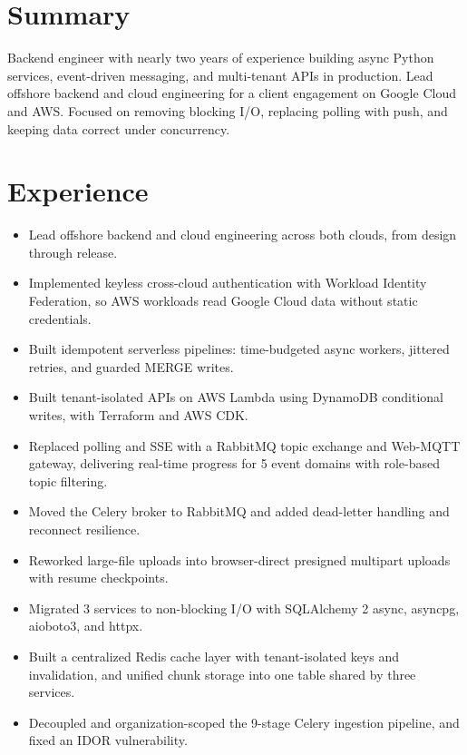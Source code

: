 \documentclass[10pt,a4paper]{article}
\begin{document}

\section{Summary}
Backend engineer with nearly two years of experience building async Python services, event-driven messaging, and multi-tenant APIs in production. Lead offshore backend and cloud engineering for a client engagement on Google Cloud and AWS. Focused on removing blocking I/O, replacing polling with push, and keeping data correct under concurrency.

\section{Experience}

\begin{itemize}
  \item Lead offshore backend and cloud engineering across both clouds, from design through release.
  \item Implemented keyless cross-cloud authentication with Workload Identity Federation, so AWS workloads read Google Cloud data without static credentials.
  \item Built idempotent serverless pipelines: time-budgeted async workers, jittered retries, and guarded MERGE writes.
  \item Built tenant-isolated APIs on AWS Lambda using DynamoDB conditional writes, with Terraform and AWS CDK.
\end{itemize}

\begin{itemize}
  \item Replaced polling and SSE with a RabbitMQ topic exchange and Web-MQTT gateway, delivering real-time progress for 5 event domains with role-based topic filtering.
  \item Moved the Celery broker to RabbitMQ and added dead-letter handling and reconnect resilience.
  \item Reworked large-file uploads into browser-direct presigned multipart uploads with resume checkpoints.
\end{itemize}

\begin{itemize}
  \item Migrated 3 services to non-blocking I/O with SQLAlchemy 2 async, asyncpg, aioboto3, and httpx.
  \item Built a centralized Redis cache layer with tenant-isolated keys and invalidation, and unified chunk storage into one table shared by three services.
  \item Decoupled and organization-scoped the 9-stage Celery ingestion pipeline, and fixed an IDOR vulnerability.
\end{itemize}
\end{document}

